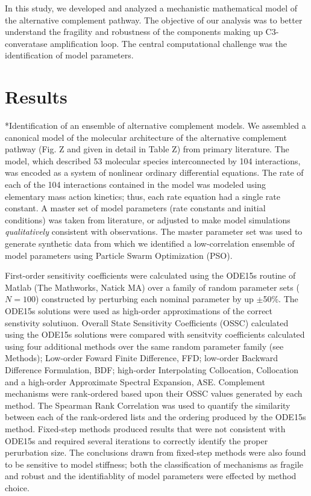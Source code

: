 \documentclass[12pt]{article}
\makeatletter
\renewcommand\subsection{\@startsection
	{subsection}{2}{0mm}
	{-0.05in}
	{-0.5\baselineskip}
	{\normalfont\normalsize\bfseries}}
\makeatother
\begin{document}
In this study, we developed and analyzed a mechanistic mathematical model of the alternative complement pathway. 
The objective of our analysis was to better understand the fragility and robustness of the components making up C3-converatase amplification loop.
The central computational challenge was the identification of model parameters.      

\section*{Results}

\subsection*{Identification of an ensemble of alternative complement models.} 
We assembled a canonical model of the molecular architecture of the alternative complement pathway (Fig. Z and given in detail in Table Z) from primary literature.
The model, which described 53 molecular species interconnected by 104 interactions, was encoded as a system of nonlinear ordinary differential equations.
The rate of each of the 104 interactions contained in the model was modeled using elementary mass action kinetics; thus, each rate equation had a single rate constant.
A master set of model parameters (rate constants and initial conditions) was taken from literature, 
or adjusted to make model simulations \emph{qualitatively} consistent with observations. 
The master parameter set was used to generate synthetic data from which we identified a low-correlation ensemble of model parameters using Particle Swarm Optimization (PSO). 


First-order sensitivity coefficients were calculated using the ODE15s routine of Matlab (The Mathworks, Natick MA)
over a family of random parameter sets ($N=100$) constructed by perturbing each nominal parameter by up $\pm${50}\%. The ODE15s solutions
were used as high-order approximations of the correct senstivity solutiuon. Overall State Sensitivity Coefficients (OSSC) calculated using the ODE15s solutions were compared 
with sensitvity coefficients calculated using four additional methods over the same random parameter family (see Methods); Low-order Foward Finite Difference, FFD; 
low-order Backward Difference Formulation, BDF; high-order Interpolating Collocation, Collocation and a high-order Approximate Spectral Expansion, ASE. 
Complement mechanisms were rank-ordered based upon their OSSC values generated by each method. The Spearman Rank Correlation was used to quantify the similarity 
between each of the rank-ordered lists and the ordering produced by the ODE15s method. Fixed-step methods produced results that were not consistent with
ODE15s and required several iterations to correctly identify the proper perurbation size. The conclusions drawn from fixed-step methods were also found to be sensitive to model
stiffness; both the classification of mechanisms as fragile and robust and the identifiablity of model parameters were effected by method choice.  
\end{document}
